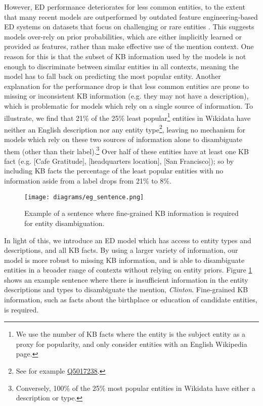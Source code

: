 \documentclass[11pt]{article}
\begin{document}
However, ED performance deteriorates for less common entities, to the extent that many recent models are outperformed by outdated feature engineering-based ED systems on datasets that focus on challenging or rare entities \cite{provatorova-etal-2021-robustness}. This suggests models over-rely on prior probabilities, which are either implicitly learned or provided as features, rather than make effective use of the mention context. One reason for this is that the subset of KB information used by the models is not enough to discriminate between similar entities in all contexts, meaning the model has to fall back on predicting the most popular entity. Another explanation for the performance drop is that less common entities are prone to missing or inconsistent KB information (e.g. they may not have a description), which is problematic for models which rely on a single source of information. To illustrate, we find that 21\% of the 25\% least popular\footnote{We use the number of KB facts where the entity is the subject entity as a proxy for popularity, and only consider entities with an English Wikipedia page.} entities in Wikidata have neither an English description nor any entity type\footnote{See for example \href{ https://www.wikidata.org/wiki/Q5017238}{Q5017238}.}, leaving no mechanism for models which rely on these two sources of information alone to disambiguate them (other than their label).\footnote{Conversely, 100\% of the 25\% most popular entities in Wikidata have either a description or type.} Over half of these entities have at least one KB fact (e.g. [Cafe Gratitude], [headquarters location], [San Francisco]); so by including KB facts the percentage of the least popular entities with no information aside from a label drops from 21\% to 8\%.

\begin{figure}[h]
    \centering
    \texttt{[image: diagrams/eg\_sentence.png]}
    \caption{Example of a sentence where fine-grained KB information is required for entity disambiguation.}
    \label{examplesentence}
\end{figure}







In light of this, we introduce an ED model which has access to entity types and descriptions, and all KB facts. By using a larger variety of information, our model is more robust to missing KB information, and is able to disambiguate entities in a broader range of contexts without relying on entity priors. Figure \ref{examplesentence} shows an example sentence where there is insufficient information in the entity descriptions and types to disambiguate the mention, \emph{Clinton}. Fine-grained KB information, such as facts about the birthplace or education of candidate entities, is required.
\end{document}
